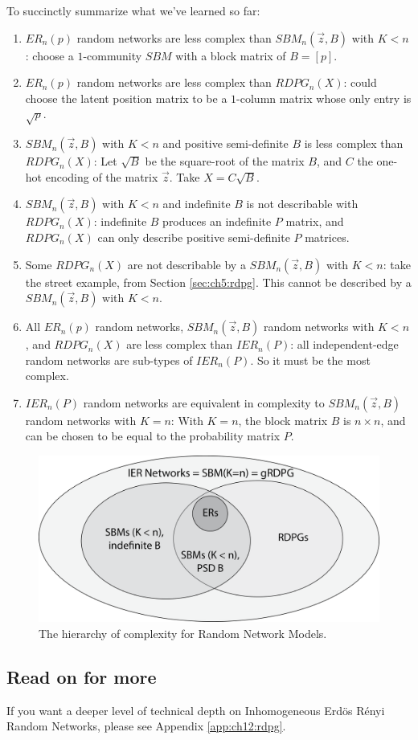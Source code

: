 To succinctly summarize what we've learned so far:
\begin{enumerate}
    \item $ER_n(p)$ random networks are less complex than $SBM_n(\vec z, B)$ with $K < n$: choose a $1$-community $SBM$ with a block matrix of $B = [p]$.
    \item $ER_n(p)$ random networks are less complex than $RDPG_n(X)$: could choose the latent position matrix to be a $1$-column matrix whose only entry is $\sqrt p$.
    \item $SBM_n(\vec z, B)$ with $K < n$ and positive semi-definite $B$ is less complex than $RDPG_n(X)$: Let $\sqrt B$ be the square-root of the matrix $B$, and $C$ the one-hot encoding of the matrix $\vec z$. Take $X = C\sqrt B$.
    \item $SBM_n(\vec z, B)$ with $K < n$ and indefinite $B$ is not describable with $RDPG_n(X)$: indefinite $B$ produces an indefinite $P$ matrix, and $RDPG_n(X)$ can only describe positive semi-definite $P$ matrices.
    \item Some $RDPG_n(X)$ are not describable by a $SBM_n(\vec z, B)$ with $K < n$: take the street example, from Section \ref{sec:ch5:rdpg}. This cannot be described by a $SBM_n(\vec z, B)$ with $K < n$.
    \item All $ER_n(p)$ random networks, $SBM_n(\vec z, B)$ random networks with $K < n$, and $RDPG_n(X)$ are less complex than $IER_n(P)$: all independent-edge random networks are sub-types of $IER_n(P)$. So it must be the most complex.
    \item $IER_n(P)$ random networks are equivalent in complexity to $SBM_n(\vec z, B)$ random networks with $K = n$: With $K = n$, the block matrix $B$ is $n \times n$, and can be chosen to be equal to the probability matrix $P$.
\end{enumerate}

\begin{figure}
    \centering
    \includegraphics[width=\linewidth]{representations/ch5/Images/unify_sn.png}
    \caption{The hierarchy of complexity for Random Network Models.}
    \label{fig:ch5:hierarchy}
\end{figure}

\subsection{Read on for more}

If you want a deeper level of technical depth on Inhomogeneous Erd\"os R\'enyi Random Networks, please see Appendix \ref{app:ch12:rdpg}.


\newpage